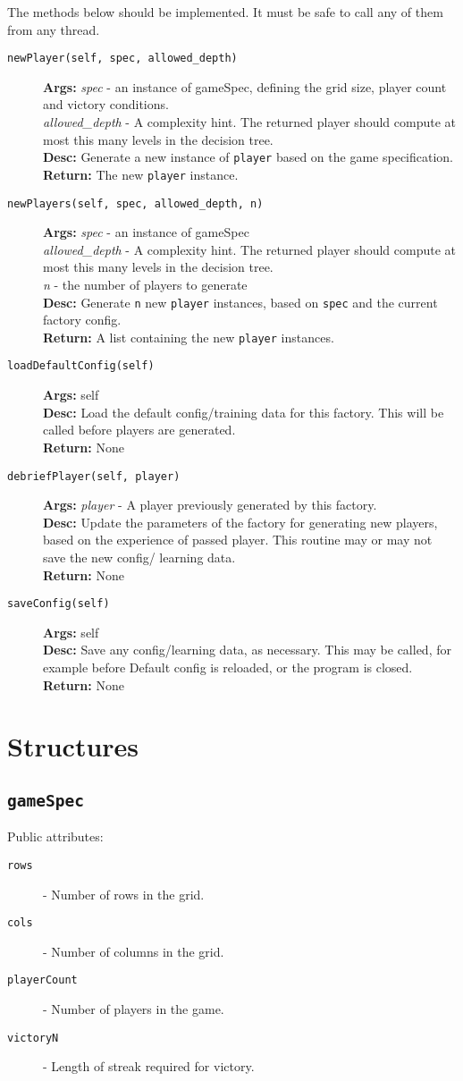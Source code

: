 \documentclass[a4paper,11pt]{article}
\newcommand{\MethodItem}[4]{\item[{\tt #1}]{\bf Args: }#2\\{\bf Desc: }#3\\{\bf Return: }#4}
\newcommand{\MethodArg}[2]{{\it #1} - #2}
\newcommand{\AttrItem}[2]{\item[{\tt #1}] - #2}
\begin{document}
The methods below should be implemented. It must be safe to call any of them from any thread.
\begin{description}
\MethodItem{newPlayer(self, spec, allowed\_depth)}{\MethodArg{spec}{an instance of gameSpec, defining the grid size, player count and victory conditions.}\\\MethodArg{allowed\_depth}{A complexity hint. The returned player should compute at most this many levels in the decision tree.}}{Generate a new instance of {\tt player} based on the game specification.}{The new {\tt player} instance.}
\MethodItem{newPlayers(self, spec, allowed\_depth, n)}{\MethodArg{spec}{an instance of gameSpec}\\\MethodArg{allowed\_depth}{A complexity hint. The returned player should compute at most this many levels in the decision tree.}\\\MethodArg{n}{the number of players to generate}}{Generate {\tt n} new {\tt player} instances, based on {\tt spec} and the current factory config.}{A list containing the new {\tt player} instances.}

\MethodItem{loadDefaultConfig(self)}{self}{Load the default config/training data for this factory. This will be called before players are generated.}{None}
\MethodItem{debriefPlayer(self, player)}{\MethodArg{player}{A player previously generated by this factory.}}{Update the parameters of the factory for generating new players, based on the experience of passed player. This routine may or may not save the new config/ learning data.}{None}
\MethodItem{saveConfig(self)}{self}{Save any config/learning data, as necessary. This may be called, for example before Default config is reloaded, or the program is closed.}{None}
\end{description}
\section{Structures}
\subsection{\tt gameSpec}
Public attributes:
\begin{description}
\AttrItem{rows}{Number of rows in the grid.}
\AttrItem{cols}{Number of columns in the grid.}
\AttrItem{playerCount}{Number of players in the game.}
\AttrItem{victoryN}{Length of streak required for victory.}
\end{description}
{}
\end{document}
